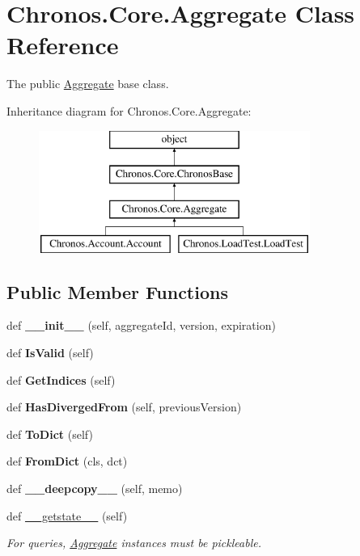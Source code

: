 \hypertarget{classChronos_1_1Core_1_1Aggregate}{}\section{Chronos.\+Core.\+Aggregate Class Reference}
\label{classChronos_1_1Core_1_1Aggregate}


The public \hyperlink{classChronos_1_1Core_1_1Aggregate}{Aggregate} base class.  


Inheritance diagram for Chronos.\+Core.\+Aggregate\+:\begin{figure}[H]
\begin{center}
\leavevmode
\includegraphics[height=4.000000cm]{classChronos_1_1Core_1_1Aggregate}
\end{center}
\end{figure}
\subsection*{Public Member Functions}
\begin{DoxyCompactItemize}
\item 
def {\bfseries \+\_\+\+\_\+init\+\_\+\+\_\+} (self, aggregate\+Id, version, expiration)
\item 
def {\bfseries Is\+Valid} (self)
\item 
def {\bfseries Get\+Indices} (self)
\item 
def {\bfseries Has\+Diverged\+From} (self, previous\+Version)
\item 
def {\bfseries To\+Dict} (self)
\item 
def {\bfseries From\+Dict} (cls, dct)
\item 
def {\bfseries \+\_\+\+\_\+deepcopy\+\_\+\+\_\+} (self, memo)
\item 
def \hyperlink{group__Chronos_gad756f2fc68dddd2ffd3ce45ef50e6820}{\+\_\+\+\_\+getstate\+\_\+\+\_\+} (self)
\begin{DoxyCompactList}\small\item\em For queries, \hyperlink{classChronos_1_1Core_1_1Aggregate}{Aggregate} instances must be pickleable. \end{DoxyCompactList}\end{DoxyCompactItemize}
